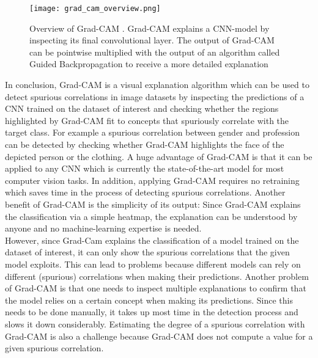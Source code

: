 \documentclass{article}
\begin{document}
\begin{figure}[!h]
    \centering
    \texttt{[image: grad\_cam\_overview.png]}
    \caption{Overview of Grad-CAM \cite{Selvaraju_2017_ICCV}. Grad-CAM explains
    a CNN-model by inspecting its final convolutional layer. The output of Grad-CAM can be pointwise multiplied
    with the output of an algorithm called Guided Backpropagation \cite{springenberg2015striving} to receive a
    more detailed explanation}
    \label{fig:gradcam}
\end{figure}
\newpage
In conclusion, Grad-CAM is a visual explanation algorithm which can be used to detect spurious correlations
in image datasets by inspecting the predictions of a CNN trained on the dataset of interest and checking whether the regions
highlighted by Grad-CAM fit to concepts that spuriously correlate with the target class.
For example a spurious correlation between gender and profession can be detected by checking whether Grad-CAM
highlights the face of the depicted person or the clothing. 
A huge advantage of Grad-CAM is that it can be applied to any CNN which is currently the state-of-the-art model
for most computer vision tasks. In addition, applying Grad-CAM requires no retraining which saves time in the process
of detecting spurious correlations. Another benefit of Grad-CAM is the simplicity of its output:
Since Grad-CAM explains the classification via a  simple heatmap, the explanation can be understood by anyone
and no machine-learning expertise is needed. \\
However, since Grad-Cam explains the classification of a model trained on the dataset of interest,
it can only show the spurious correlations that the given model exploits. This can lead to problems because
different models can rely on different (spurious) correlations when making their predictions.
Another problem of Grad-CAM is that one needs to inspect multiple explanations to confirm that the model
relies on a certain concept when making its predictions. Since this needs to be done manually, it takes up
most time in the detection process and slows it down considerably. Estimating the degree of a spurious correlation
with Grad-CAM is also a challenge because Grad-CAM does not compute a value for a given spurious correlation.
\end{document}
